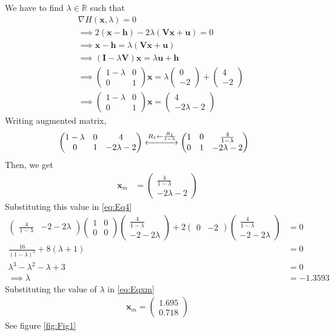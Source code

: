 \documentclass[12pt]{article}
\providecommand{\brak}[1]{\ensuremath{\left(#1\right)}}
\newcommand{\myvec}[1]{\ensuremath{\begin{pmatrix}#1\end{pmatrix}}}
\let\vec\mathbf
\begin{document}
We have to find $\lambda \in \mathbb{R}$ such that
\begin{align}
	&\nabla H\brak{\vec{x},\lambda} = 0 \\
        \label{eq:Eqlambda}
	&\implies 2\brak{\vec{x}-\vec{h}} - 2\lambda\brak{\vec{V}\vec{x}+\vec{u}} = 0 \\
        \label{eq:Eqx}
	&\implies \vec{x} - \vec{h} =  \lambda\brak{\vec{V}\vec{x}+\vec{u}}   \\
	&\implies \brak{\vec{I} - \lambda\vec{V}}\vec{x} =  \lambda\vec{u}+\vec{h} \\ 
	&\implies \myvec{1-\lambda & 0 \\ 0 & 1}\vec{x} = \lambda\myvec{0 \\ -2} + \myvec{4 \\-2} \\ 
        \label{eq:EqL}
	&\implies \myvec{1-\lambda & 0 \\ 0 & 1}\vec{x} = \myvec{4 \\ -2\lambda-2}  
\end{align}
Writing augmented matrix,
\begin{align}
	&\myvec{1-\lambda & 0 & 4\\ 0 & 1 & -2\lambda-2} \xleftrightarrow[]{R_1 \leftarrow \frac{R_1}{1-\lambda}} \myvec{1&0&\frac{4}{1-\lambda}\\0&1&-2\lambda-2}
\end{align}
Then, we get
\begin{align}
        \label{eq:Eqxm}
	\vec{x}_{m} &= \myvec{ \frac{4}{1-\lambda} \\ -2\lambda-2}
\end{align}
Substituting this value in \eqref{eq:Eq4}
\begin{align}
	\myvec{\frac{4}{1-\lambda}&-2-2\lambda}\myvec{1&0\\0&0}\myvec{\frac{4}{1-\lambda}\\-2-2\lambda}+2\myvec{0&-2}\myvec{\frac{4}{1-\lambda}\\-2-2\lambda} &= 0\\
	\frac{16}{\brak{1-\lambda}^2}+8\brak{\lambda+1} &= 0\\
	\lambda^3-\lambda^2-\lambda+3&=0\\
	\implies \lambda &= -1.3593
\end{align}
Substituting the value of $\lambda$ in \eqref{eq:Eqxm}
\begin{align}
	\vec{x}_{m} = \myvec{1.695\\0.718}
\end{align}
See figure \ref{fig:Fig1}
\end{document}
